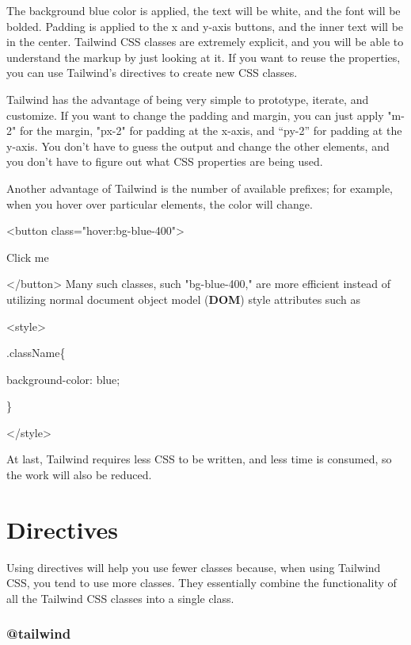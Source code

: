 \documentclass[conference]{IEEEtran}
\begin{document}
The background blue color is applied, the text will be white, and the font will be bolded. Padding is applied to the x and y-axis buttons, and the inner text will be in the center. Tailwind CSS classes are extremely explicit, and you will be able to understand the markup by just looking at it. If you want to reuse the properties, you can use Tailwind's directives to create new CSS classes.

Tailwind has the advantage of being very simple to prototype, iterate, and customize. If you want to change the padding and margin, you can just apply "m-2" for the margin, "px-2" for padding at the x-axis, and “py-2” for padding at the y-axis. You don't have to guess the output and change the other elements, and you don't have to figure out what CSS properties are being used.  

Another advantage of Tailwind is the number of available prefixes; for
example, when you hover over particular elements, the color will change.

\textless button class="hover:bg-blue-400"\textgreater{}

Click me

\textless/button\textgreater{}
\newline
Many such classes, such "bg-blue-400," are more efficient instead of utilizing normal document object model (\textbf{DOM}) style attributes
such as
\newline

\textless style\textgreater{}

.className\{

background-color: blue;

\}

\textless/style\textgreater{}

\newline
At last, Tailwind requires less CSS to be written, and less time is
consumed, so the work will also be reduced.

\section{Directives}

Using directives will help you use fewer classes because, when using Tailwind CSS, you tend to use more classes. They essentially combine the functionality of all the Tailwind CSS classes into a single class.

\subsubsection{{@tailwind}}\label{tailwind}
\end{document}
